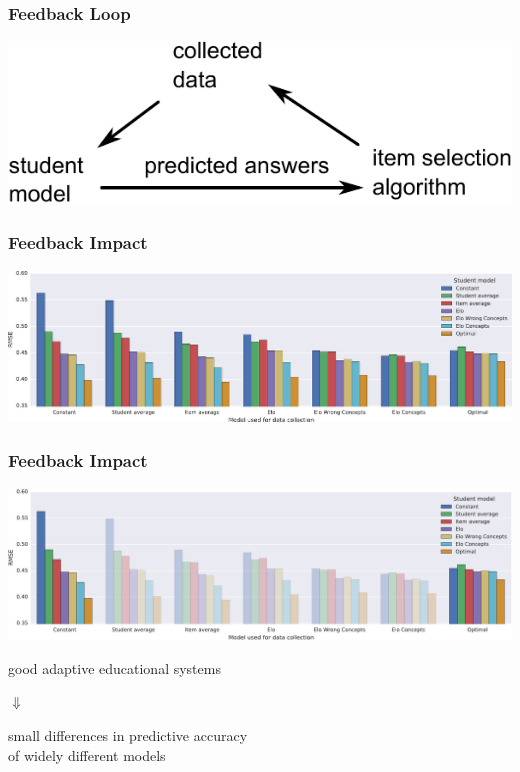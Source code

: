 \documentclass[bigger]{beamer}
\begin{document}

\begin{frame}
  \frametitle{Feedback Loop}

  \begin{center}
    \includegraphics[width=.75\linewidth]{feedback}
  \end{center}
\end{frame}

\begin{frame}
  \frametitle{Feedback Impact}
  \begin{center}
    \includegraphics[width=\linewidth]{rmse_complex}
  \end{center}
\end{frame}

\begin{frame}
  \frametitle{Feedback Impact}
  \begin{center}
    \includegraphics[width=\linewidth]{rmse_complex1}
  \end{center}

  \bigskip

  \begin{center}
    good adaptive educational systems 
    
    $\Downarrow$

    small differences in predictive accuracy\\
    of widely different models
  \end{center}
\end{frame}
\end{document}
